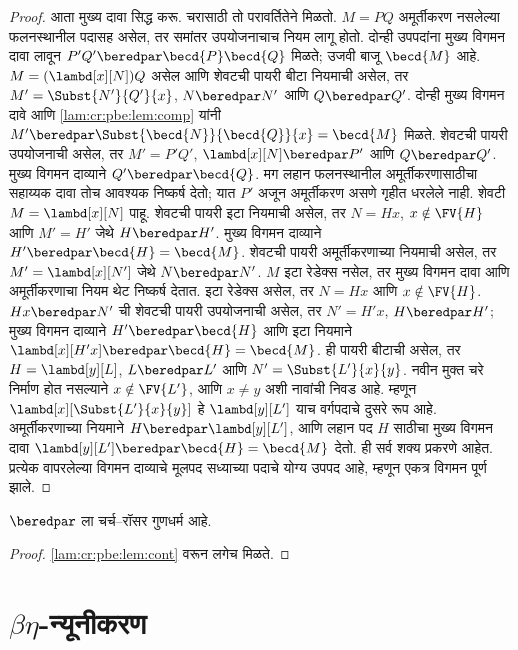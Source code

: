 \begin{proof}
आता मुख्य दावा सिद्ध करू. चरासाठी तो परावर्तितेने मिळतो.
$M=PQ$ अमूर्तीकरण नसलेल्या फलनस्थानील पदासह असेल,
तर समांतर उपयोजनाचाच नियम लागू होतो. दोन्ही उपपदांना
मुख्य विगमन दावा लावून $P'Q'\beredpar\becd{P}\becd{Q}$
मिळते; उजवी बाजू $\becd{M}$ आहे.
$M=(\lambd[x][N])Q$ असेल आणि शेवटची पायरी बीटा
नियमाची असेल, तर $M'=\Subst{N'}{Q'}{x}$,
$N\beredpar N'$ आणि $Q\beredpar Q'$.
दोन्ही मुख्य विगमन दावे आणि \ref{lam:cr:pbe:lem:comp} यांनी
$M'\beredpar\Subst{\becd{N}}{\becd{Q}}{x}=\becd{M}$
मिळते. शेवटची पायरी उपयोजनाची असेल, तर
$M'=P'Q'$, $\lambd[x][N]\beredpar P'$ आणि
$Q\beredpar Q'$. मुख्य विगमन दाव्याने
$Q'\beredpar\becd{Q}$. मग लहान फलनस्थानील
अमूर्तीकरणासाठीचा सहाय्यक दावा तोच आवश्यक निष्कर्ष देतो;
यात $P'$ अजून अमूर्तीकरण असणे गृहीत धरलेले नाही.
शेवटी $M=\lambd[x][N]$ पाहू. शेवटची पायरी इटा
नियमाची असेल, तर $N=Hx$, $x\notin\FV{H}$ आणि
$M'=H'$ जेथे $H\beredpar H'$. मुख्य विगमन दाव्याने
$H'\beredpar\becd{H}=\becd{M}$.
शेवटची पायरी अमूर्तीकरणाच्या नियमाची असेल, तर
$M'=\lambd[x][N']$ जेथे $N\beredpar N'$.
$M$ इटा रेडेक्स नसेल, तर मुख्य विगमन दावा आणि
अमूर्तीकरणाचा नियम थेट निष्कर्ष देतात.
इटा रेडेक्स असेल, तर $N=Hx$ आणि $x\notin\FV{H}$.
$Hx\beredpar N'$ ची शेवटची पायरी उपयोजनाची असेल,
तर $N'=H'x$, $H\beredpar H'$; मुख्य विगमन दाव्याने
$H'\beredpar\becd{H}$ आणि इटा नियमाने
$\lambd[x][H'x]\beredpar\becd{H}=\becd{M}$.
ही पायरी बीटाची असेल, तर $H=\lambd[y][L]$,
$L\beredpar L'$ आणि $N'=\Subst{L'}{x}{y}$.
नवीन मुक्त चरे निर्माण होत नसल्याने $x\notin\FV{L'}$,
आणि $x\ne y$ अशी नावांची निवड आहे. म्हणून
$\lambd[x][\Subst{L'}{x}{y}]$ हे $\lambd[y][L']$
याच वर्गपदाचे दुसरे रूप आहे. अमूर्तीकरणाच्या नियमाने
$H\beredpar\lambd[y][L']$, आणि लहान पद $H$ साठीचा
मुख्य विगमन दावा
$\lambd[y][L']\beredpar\becd{H}=\becd{M}$ देतो.
ही सर्व शक्य प्रकरणे आहेत. प्रत्येक वापरलेल्या विगमन
दाव्याचे मूलपद सध्याच्या पदाचे योग्य उपपद आहे,
म्हणून एकत्र विगमन पूर्ण झाले.
\end{proof}

\begin{thm}\label{lam:cr:pbe:thm:cr}
  $\beredpar$ ला चर्च–रॉसर गुणधर्म आहे.
\end{thm}

\begin{proof}
  \ref{lam:cr:pbe:lem:cont} वरून लगेच मिळते.
\end{proof}












\section{$\beta\eta$-न्यूनीकरण}\label{lam:cr:be:sec}

